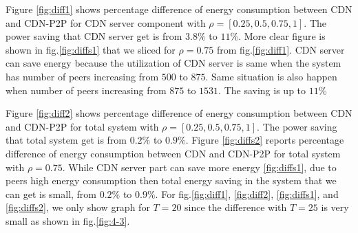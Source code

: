 \documentclass[conference]{IEEEtran}
\begin{document}
Figure \ref{fig:diff1} shows percentage difference of energy consumption between CDN and CDN-P2P for CDN server component with $\rho=[0.25,0.5,0.75,1]$.
The power saving that CDN server get is from $3.8\%$ to $11\%$.
More clear figure is shown in fig.\ref{fig:diffs1} that we sliced for $\rho=0.75$ from fig.\ref{fig:diff1}. 
CDN server can save energy because the utilization of CDN server is same when the system has number of peers increasing from $500$ to $875$.
Same situation is also happen when number of peers increasing from $875$ to $1531$.  
The saving is up to $11\%$ 

Figure \ref{fig:diff2} shows percentage difference of energy consumption between CDN and CDN-P2P for total system with $\rho=[0.25,0.5,0.75,1]$.
The power saving that total system get is from $0.2\%$ to $0.9\%$.
Figure \ref{fig:diffs2} reports percentage difference of energy consumption between CDN and CDN-P2P for total system with $\rho=0.75$.
While CDN server part can save more energy \ref{fig:diffs1}, due to peers high energy consumption then total energy saving in the system that we can get is small, from $0.2\%$ to $0.9\%$.
For fig.\ref{fig:diff1}, \ref{fig:diff2}, \ref{fig:diffs1}, and \ref{fig:diffs2}, we only show graph for $T=20$ since the difference with $T=25$ is very small as shown in fig.\ref{fig:4-3}.
\end{document}
